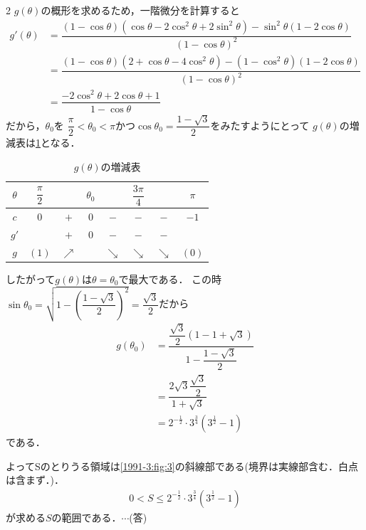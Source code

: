 \documentclass[../../main.tex]{subfiles}
\begin{document}
\begin{multicols}{2}
  $g(\theta)$の概形を求めるため，一階微分を計算すると
  \begin{align}
    g'(\theta)
    & = \dfrac{(1-\cos\theta)(\cos\theta-2\cos^2\theta+2\sin^2\theta)-\sin^2\theta(1-2\cos\theta)}{(1-\cos\theta)^2} \\
    & = \dfrac{(1-\cos\theta)(2+\cos\theta-4\cos^2\theta)-(1-\cos^2\theta)(1-2\cos\theta)}{(1-\cos\theta)^2}         \\
    & = \dfrac{-2\cos^2\theta+2\cos\theta+1}{1-\cos\theta}
  \end{align}
  だから，$\theta_0 $を $\dfrac{\pi}{2}<\theta_0<\pi $かつ$ \cos\theta_0 = \dfrac{1-\sqrt{3}}{2} $をみたすようにとって
  $g(\theta)$の増減表は\cref{1991-3:table:1}となる．

  \begin{table}[H]
    \centering
    \caption{$g(\theta)$の増減表}
    \label{1991-3:table:1}
    \begin{tabular}{c||c|c|c|c|c|c|c|}
      $\theta$ & $\dfrac{\pi}{2}$ &            & $\theta_0$ &            & $\dfrac{3\pi}{4}$ &            & $\pi$ \\ \hline
      $c$      & $0$             & $+$        & $0$        & $-$        & $-$              & $-$        & $-1$  \\ \hline
      $g'$     &                 & $+$        & $0$        & $-$        & $-$              & $-$        &       \\ \hline
      $g$      & $(1)$           & $\nearrow$ &            & $\searrow$ & $\searrow$       & $\searrow$ & $(0)$
    \end{tabular}
  \end{table}

  したがって$g(\theta)$は$\theta = \theta_0$で最大である．
  この時$\sin\theta_0 = \sqrt{1 - \left(\dfrac{1-\sqrt{3}}{2}\right)^2} = \dfrac{\sqrt{3}}{2}$だから
  \begin{align}
    g(\theta_0)
    & = \dfrac{\dfrac{\sqrt{3}}{2}(1-1+\sqrt{3})}{1-\dfrac{1-\sqrt{3}}{2}} \\
    & = \dfrac{2\sqrt{3}\dfrac{\sqrt{3}}{2}}{1+\sqrt{3}}                  \\
    & = 2^{-\frac{1}{2}} \cdot 3^{\frac{3}{4}}(3^{\frac{1}{2}}-1)
  \end{align}
  である．

  よってSのとりうる領域は\cref{1991-3:fig:3}の斜線部である(境界は実線部含む．白点は含まず．)．
  \begin{align}
    0 < S \le 2^{-\frac{1}{2}} \cdot 3^{\frac{3}{4}}\left(3^{\frac{1}{2}}-1\right)
  \end{align}
  が求める$S$の範囲である．$\cdots$(答)


\end{multicols}
\end{document}
